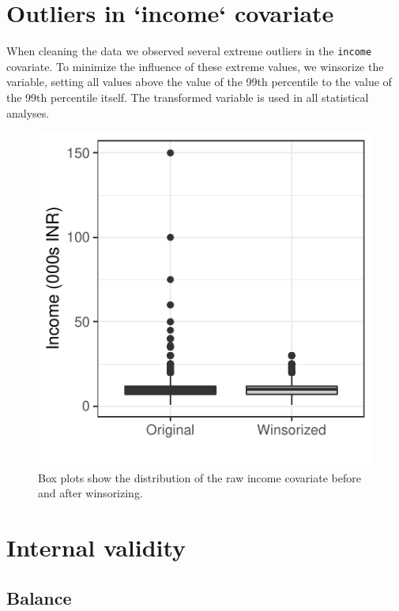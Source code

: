 \documentclass[
  11.5pt,
]{article}
\begin{document}
\clearpage

\section{Outliers in `income` covariate}

When cleaning the data we observed several extreme outliers in the
\texttt{income} covariate. To minimize the influence of these extreme
values, we winsorize the variable, setting all values above the value of
the 99th percentile to the value of the 99th percentile itself. The
transformed variable is used in all statistical analyses.

\begin{figure}
\centering
\includegraphics{supplementary-information_files/figure-latex/unnamed-chunk-39-1.pdf}
\caption{Box plots show the distribution of the raw income covariate
before and after winsorizing.}
\end{figure}

\clearpage

\section{Internal validity}

\subsection{Balance}
\end{document}
